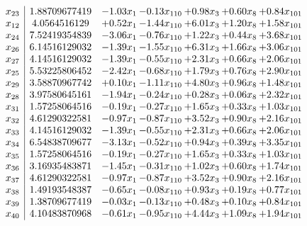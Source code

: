 \documentclass[8pt]{article}
\begin{document}
\[\begin{array}{c| c c@{\hskip 2pt} c@{\hskip 2pt} c@{\hskip 2pt} c@{\hskip 2pt} c@{\hskip 2pt} }
 x_{23}   &  1.88709677419 & -1.03 x_{1} & -0.13 x_{110} & +  0.98 x_{3} & +  0.60 x_{8} & +  0.84 x_{101}\\
 x_{12}   &  4.0564516129 & +  0.52 x_{1} & -1.44 x_{110} & +  6.01 x_{3} & +  1.20 x_{8} & +  1.58 x_{101}\\
 x_{24}   &  7.52419354839 & -3.06 x_{1} & -0.76 x_{110} & +  1.22 x_{3} & +  0.44 x_{8} & +  3.68 x_{101}\\
 x_{26}   &  6.14516129032 & -1.39 x_{1} & -1.55 x_{110} & +  6.31 x_{3} & +  1.66 x_{8} & +  3.06 x_{101}\\
 x_{27}   &  4.14516129032 & -1.39 x_{1} & -0.55 x_{110} & +  2.31 x_{3} & +  0.66 x_{8} & +  2.06 x_{101}\\
 x_{25}   &  5.53225806452 & -2.42 x_{1} & -0.68 x_{110} & +  1.79 x_{3} & +  0.76 x_{8} & +  2.90 x_{101}\\
 x_{29}   &  3.58870967742 & +  0.10 x_{1} & -1.11 x_{110} & +  4.80 x_{3} & +  0.96 x_{8} & +  1.48 x_{101}\\
 x_{28}   &  3.97580645161 & -1.94 x_{1} & -0.24 x_{110} & +  0.28 x_{3} & +  0.06 x_{8} & +  2.32 x_{101}\\
 x_{31}   &  1.57258064516 & -0.19 x_{1} & -0.27 x_{110} & +  1.65 x_{3} & +  0.33 x_{8} & +  1.03 x_{101}\\
 x_{32}   &  4.61290322581 & -0.97 x_{1} & -0.87 x_{110} & +  3.52 x_{3} & +  0.90 x_{8} & +  2.16 x_{101}\\
 x_{33}   &  4.14516129032 & -1.39 x_{1} & -0.55 x_{110} & +  2.31 x_{3} & +  0.66 x_{8} & +  2.06 x_{101}\\
 x_{34}   &  6.54838709677 & -3.13 x_{1} & -0.52 x_{110} & +  0.94 x_{3} & +  0.39 x_{8} & +  3.35 x_{101}\\
 x_{35}   &  1.57258064516 & -0.19 x_{1} & -0.27 x_{110} & +  1.65 x_{3} & +  0.33 x_{8} & +  1.03 x_{101}\\
 x_{36}   &  3.16935483871 & -1.45 x_{1} & -0.31 x_{110} & +  1.02 x_{3} & +  0.60 x_{8} & +  1.74 x_{101}\\
 x_{37}   &  4.61290322581 & -0.97 x_{1} & -0.87 x_{110} & +  3.52 x_{3} & +  0.90 x_{8} & +  2.16 x_{101}\\
 x_{38}   &  1.49193548387 & -0.65 x_{1} & -0.08 x_{110} & +  0.93 x_{3} & +  0.19 x_{8} & +  0.77 x_{101}\\
 x_{39}   &  1.38709677419 & -0.03 x_{1} & -0.13 x_{110} & +  0.48 x_{3} & +  0.10 x_{8} & +  0.84 x_{101}\\
 x_{40}   &  4.10483870968 & -0.61 x_{1} & -0.95 x_{110} & +  4.44 x_{3} & +  1.09 x_{8} & +  1.94 x_{101}\\

\end{array}\]
\end{document}

